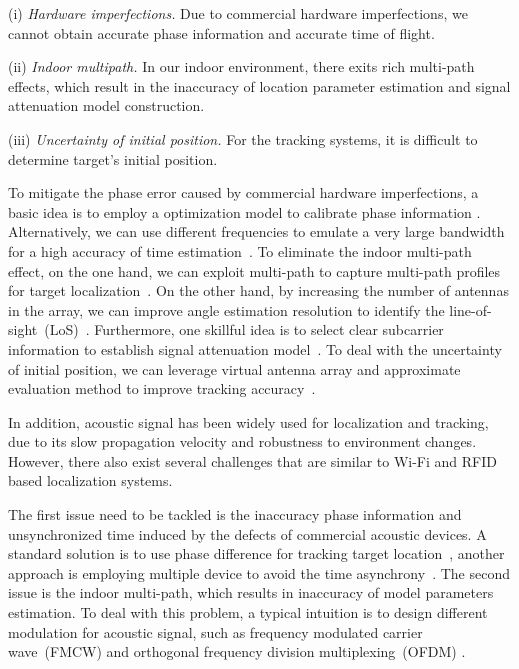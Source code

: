 (i) \emph{Hardware imperfections.} Due to commercial hardware imperfections, we cannot obtain accurate phase information and accurate time of flight.

(ii) \emph{Indoor multipath.} In our indoor environment, there exits rich  multi-path effects, which result in the inaccuracy of location parameter estimation and signal attenuation model construction.

(iii) \emph{Uncertainty of initial position.} For the tracking systems, it is difficult to determine target's initial position.


 To mitigate the phase error caused by commercial hardware imperfections, a basic idea is to employ a optimization model to calibrate phase
 information \cite{Wang2016D}. Alternatively, we can use different frequencies to emulate a very large bandwidth for a high accuracy of
 time estimation~\cite{RFind}. To eliminate the indoor multi-path effect, on the one hand, we can exploit multi-path to capture multi-path
 profiles for target localization~\cite{PinIt}. On the other hand, by increasing the number of antennas in the array, we can improve angle
 estimation resolution to identify the line-of-sight~(LoS)~\cite{Arraytrack, Spotfi}. Furthermore, one skillful idea is to select clear
 subcarrier information to establish signal attenuation model~\cite{wang2016lifs}. To deal with the uncertainty of initial position, we can
 leverage virtual antenna array and approximate evaluation method to improve tracking accuracy~\cite{Tagoram}.

In addition, acoustic signal has been widely used for localization and tracking, due to its slow propagation velocity and robustness to
environment changes. However, there also exist several challenges that are similar to Wi-Fi and RFID based localization systems.

The first issue need to be tackled is the inaccuracy phase information and unsynchronized time induced by the defects of commercial
acoustic devices. A standard solution is to use phase difference for tracking target location~\cite{LLAP}, another approach is employing
multiple device to avoid the time asynchrony~\cite{BeepBeep}.  The second issue is the indoor multi-path, which results in inaccuracy of
model parameters estimation. To deal with this problem, a typical intuition is to design different modulation for acoustic signal, such as
frequency modulated carrier wave~(FMCW) and orthogonal frequency division multiplexing~(OFDM) \cite{CAT,STRATA}.
